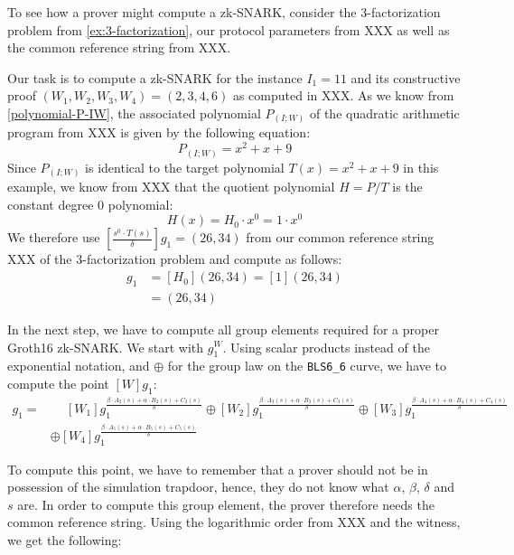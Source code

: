 \begin{example} To see how a prover might compute 
a zk-SNARK, consider the $3$-factorization problem from \ref{ex:3-factorization}, our protocol parameters from XXX as well as the common reference string from XXX.

Our task is to compute a zk-SNARK for the instance $I_1=11$ and its constructive proof $(W_1,W_2,W_3,W_4)=(2,3,4,6)$ as computed in XXX. As we know from \ref{polynomial-P-IW}, the associated polynomial $P_{(I;W)}$ of the quadratic arithmetic program from XXX is given by the following equation:
$$
P_{(I;W)} = x^2 + x + 9
$$ 
Since $P_{(I;W)}$ is identical to the target polynomial $T(x)=x^2+x + 9$ in this example, we know from XXX that the quotient polynomial $H=P/T$ is the constant degree $0$ polynomial:
$$
H(x)= H_0 \cdot x^0 = 1 \cdot x^0
$$
We therefore use $[\frac{s^0\cdot T(s)}{\delta}]g_1=(26,34)$ from our common reference string XXX of the $3$-factorization problem and compute as follows:
\begin{align*}
[\frac{H(s)\cdot T(s)}{\delta}]g_1 &= [H_0](26,34)=[1](26,34)\\
                                   &= (26,34)
\end{align*}

In the next step, we have to compute all group elements required for a proper Groth16 zk-SNARK. We start with $g_1^W$. Using scalar products instead of the exponential notation, and $\oplus$ for the group law on the \texttt{BLS6\_6} curve, we have to compute the point $[W]g_1$:
\begin{align*}
[W]g_1 = & \phantom{\oplus} [W_1] g_1^{\frac{\beta\cdot A_{2}(s)+\alpha\cdot B_{2}(s)+C_{2}(s)}{\delta}}
        \oplus [W_2] g_1^{\frac{\beta\cdot A_{3}(s)+\alpha\cdot B_{3}(s)+C_{3}(s)}{\delta}}        
         \oplus [W_3] g_1^{\frac{\beta\cdot A_{4}(s)+\alpha\cdot B_{4}(s)+C_{4}(s)}{\delta}}\\        
         &\oplus [W_4] g_1^{\frac{\beta\cdot A_{5}(s)+\alpha\cdot B_{5}(s)+C_{5}(s)}{\delta}}
\end{align*}

To compute this point, we have to remember that a prover should not be in possession of the simulation trapdoor, hence, they do not know what $\alpha$, $\beta$, $\delta$ and $s$ are. In order to compute this group element, the prover therefore needs the common reference string. Using the logarithmic order from XXX and the witness, we get the following:


\end{example}
